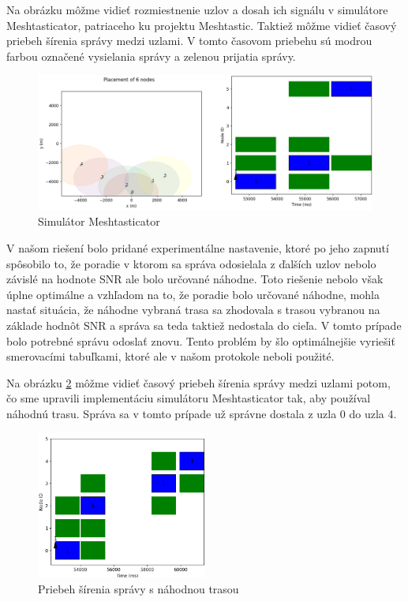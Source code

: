 \documentclass[slovak,master]{diploma}
\begin{document}
Na obrázku môžme vidieť rozmiestnenie uzlov a dosah ich signálu v simulátore Meshtasticator, patriaceho ku projektu Meshtastic. Taktiež môžme vidieť časový priebeh šírenia správy medzi uzlami. 
V tomto časovom priebehu sú modrou farbou označené vysielania správy a zelenou prijatia správy.

\begin{figure}[h!]
  \centering
  \includegraphics[width=1\textwidth]{Figures/meshtasticV.png}
  \caption{Simulátor Meshtasticator}
  \label{fig:mestasticV}
\end{figure}

V našom riešení bolo pridané experimentálne nastavenie, ktoré po jeho zapnutí spôsobilo to, že poradie v ktorom sa správa odosielala z ďalších uzlov 
nebolo závislé na hodnote SNR ale bolo určované náhodne. Toto riešenie nebolo však úplne optimálne a vzhľadom na to, že poradie bolo určované 
náhodne, mohla nastať situácia, že náhodne vybraná trasa sa zhodovala s trasou vybranou 
na základe hodnôt SNR a správa sa teda taktiež nedostala do cieľa. V tomto prípade bolo potrebné správu odoslať znovu. 
Tento problém by šlo optimálnejšie vyriešiť smerovacími tabuľkami, ktoré ale v našom protokole neboli použité.

Na obrázku \ref{fig:randomizePath} môžme vidieť časový priebeh šírenia správy medzi uzlami potom, čo sme upravili implementáciu simulátoru Meshtasticator tak, 
aby používal náhodnú trasu. Správa sa v tomto prípade už správne dostala z uzla 0 do uzla 4.

\begin{figure}[h!]
  \centering
  \includegraphics[width=0.5\textwidth]{Figures/randomizePath.png}
  \caption{Priebeh šírenia správy s náhodnou trasou}
  \label{fig:randomizePath}
\end{figure}
\end{document}
